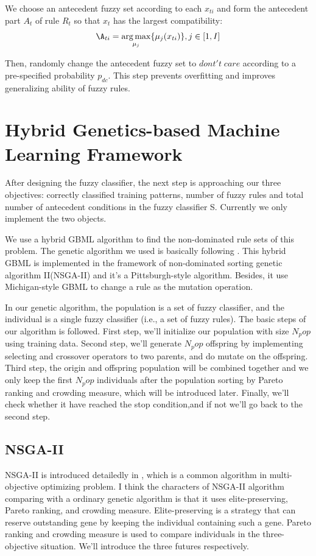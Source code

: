 \documentclass[conference]{IEEEtran}
\begin{document}
  We choose an antecedent fuzzy set according to each $x_{ti}$ and form the antecedent part $A_t$ of rule $R_t$ so that $x_{t}$ has the largest compatibility:
  $$ \A_{ti} = \underset{\mu_j}{\arg\max}\{\mu_{j}(x_{ti})\},j \in [1,I]$$
  
  Then, randomly change the antecedent fuzzy set to $dont't\;care$ according to a pre-specified probability $p_{dc}$. This step prevents overfitting and improves generalizing ability of fuzzy rules.
  \section{Hybrid Genetics-based Machine Learning Framework}
	 \par After designing the fuzzy classifier, the next step is approaching our three objectives: correctly classified training patterns, number of fuzzy rules and total number of antecedent conditions in the fuzzy classifier S. Currently we only implement the two objects.
	 \par
	 We use a hybrid GBML algorithm to find the non-dominated rule sets of this problem. The genetic algorithm we used is basically following \cite{ISHIBUCHI20074}. This hybrid GBML is implemented in the framework of non-dominated sorting genetic algorithm II(NSGA-II) and it's a Pittsburgh-style algorithm. Besides, it use Michigan-style GBML to change a rule as the mutation operation. 
	 \par
	In our genetic algorithm, the population is a set of fuzzy classifier, and the individual is a single fuzzy classifier (i.e., a set of fuzzy rules). The basic steps of our algorithm is followed. First step, we'll initialize our population with size $N_pop$ using training data. Second step, we'll generate $N_pop$ offspring by implementing selecting and crossover operators to two parents, and do mutate on the offspring. Third step, the origin and offspring population will be combined together and we only keep the first $N_pop$ individuals after the population sorting by Pareto ranking and crowding measure, which will be introduced later. Finally, we'll check whether it have reached the stop condition,and if not we'll go back to the second step.
	 
	 \subsection{NSGA-II}
	 \par
	 NSGA-II is introduced detailedly in \cite{996017}, which is a common algorithm in multi-objective optimizing problem. I think the characters of NSGA-II algorithm comparing with a ordinary genetic algorithm is that it uses elite-preserving, Pareto ranking, and crowding measure. Elite-preserving is a strategy that can reserve outstanding gene by keeping the individual containing such a gene. Pareto ranking and crowding measure is used to compare individuals in the three-objective situation. We'll introduce the three futures respectively.
\end{document}
